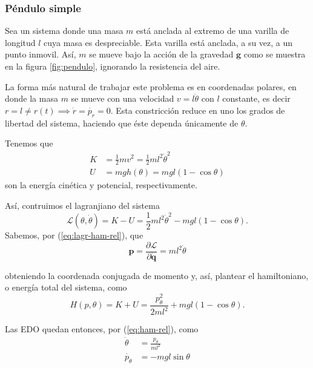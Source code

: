\subsubsection{Péndulo simple}
\label{sec:pendulo}
Sea un sistema donde una masa $m$ está anclada al extremo de una varilla de longitud $l$ cuya masa es despreciable. Esta varilla está anclada, a su vez, a un punto inmovil. Así, $m$ se mueve bajo la acción de la gravedad $\mathbf{g}$ como se muestra en la figura \ref{fig:pendulo}, ignorando la resistencia del aire.


La forma más natural de trabajar este problema es en coordenadas polares, en donde la masa $m$ se mueve con una velocidad $v = l\dot{\theta}$ con $l$ constante, es decir $r = l \neq r(t) \implies \dot{r} = \dot{p_r} = 0$. Esta constricción reduce en uno los grados de libertad del sistema, haciendo que éste dependa únicamente de $\theta$. 

Tenemos que 
\begin{align}
 K &= \frac{1}{2}m v^2 = \frac{1}{2} m l^2 \dot{\theta}^2 \nonumber \\
 U &= mgh(\theta) = mgl\left(1 - \cos{\theta} \right)
\end{align}
son la energía cinética y potencial, respectivamente. 

Así, contruimos el lagranjiano del sistema
\begin{equation*}
 \mathcal{L}(\theta,\dot{\theta}) = K - U = \frac{1}{2} m l^2 \dot{\theta}^2 - mgl\left(1 - \cos{\theta} \right).
\end{equation*}
Sabemos, por (\ref{eq:lagr-ham-rel}), que
\begin{equation*}
 \mathbf{p} = \frac{\partial \mathcal{L}}{\partial \mathbf{\dot{q}}} = ml^2\dot{\theta}
\end{equation*}

obteniendo la coordenada conjugada de momento y, así, plantear el hamiltoniano, o energía total del sistema, como
\begin{equation}
 H(p,\theta) = K + U = \frac{p_{\theta}^2}{2ml^2} + mgl\left(1 - \cos{\theta} \right).
\label{eq:pendulo-ham}
\end{equation}
 
Las EDO quedan entonces, por (\ref{eq:ham-rel}), como
\begin{align}
 \dot{\theta} &= \frac{p_{\theta}}{ml^2} \nonumber \\
 \dot{p_{\theta}} &= -mgl\sin{\theta} 
\label{eq:pendulo-ode}
\end{align}

